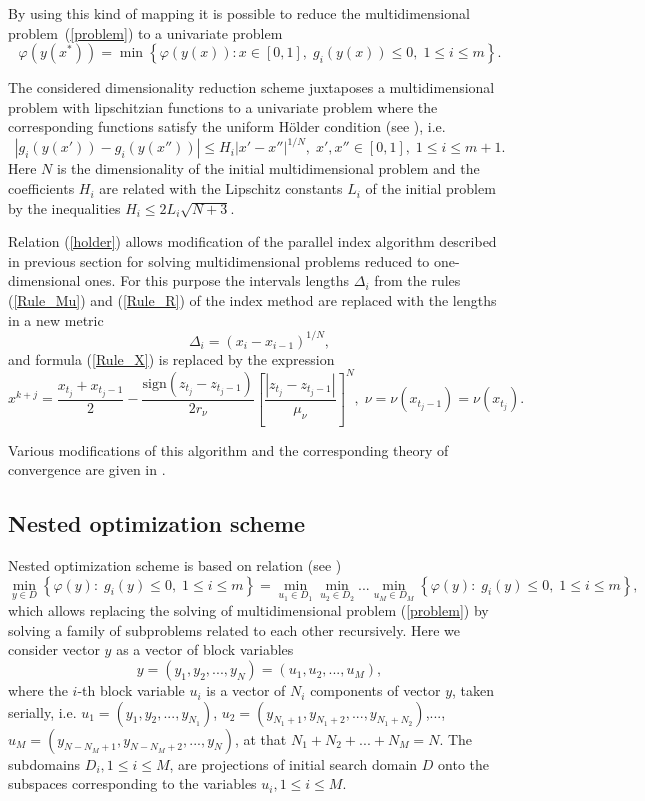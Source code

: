\documentclass[a4paper]{jpconf}
\begin{document}
By using this kind of mapping it is possible to reduce the multidimensional 
problem~(\ref{problem}) to a univariate problem
\[
\varphi(y(x^\ast))=\min \left\{\varphi(y(x)): x \in [0,1], \; g_i(y(x))\leq 
0, \; 1 \leq i \leq m\right\}.
\]

The considered dimensionality reduction scheme juxtaposes a
multidimensional problem with lipschitzian functions to a univariate
problem where the corresponding functions satisfy the uniform H{\"o}lder
condition (see \cite{Strongin2000}), i.e.
\begin{equation}\label{holder}
\left|g_i(y(x'))-g_i (y(x''))\right| \leq H_i \left|x'-x'' \right|^{1/N}, \; 
x',x''\in [0,1], \; 1\leq i \leq m+1.
\end{equation}
Here $N$ is the dimensionality of the initial multidimensional problem and
the coefficients $H_i$ are related with the Lipschitz constants $L_i$ of
the initial problem by the inequalities $H_i \leq 2L_i \sqrt{N+3}$.

Relation (\ref{holder}) allows modification of the parallel index algorithm described in previous section for solving multidimensional problems reduced to one-dimensional ones. For this purpose the intervals lengths $\Delta_i$ from the rules (\ref{Rule_Mu}) and (\ref{Rule_R}) of the index method are replaced with the lengths in a new metric
\[
\Delta_i = \left(x_i-x_{i-1}\right)^{1/N},
\]
and formula (\ref{Rule_X}) is replaced by the expression
\[
x^{k+j} = \frac{x_{t_j}+x_{t_j-1}}{2} - \frac{\mathrm{sign}(z_{t_j}-z_{t_j-1})}{2r_\nu}\left[\frac{\left|z_{t_j}-z_{t_j-1}\right|}{\mu_\nu}\right]^N, \; \nu=\nu(x_{t_j-1})=\nu(x_{t_j}).
\]

Various modifications of this algorithm and the corresponding theory of convergence are given in \cite{Strongin2000,Strongin2013,Gergel2005}.


\subsection{Nested optimization scheme}

Nested optimization scheme is based on relation (see \cite{Strongin2013})
\[
\min_{y \in D}{\left\{\varphi(y): \; g_i(y)\leq 0, \; 1 \leq i \leq 
m\right\}}= \min_{u_1\in D_1}\min_{u_2\in D_2}...\min_{u_M\in D_M 
}{\left\{\varphi(y): \; g_i(y)\leq 0, \; 1 \leq i \leq m\right\}},
\]
which allows replacing the solving of multidimensional problem 
(\ref{problem}) by solving a family of subproblems related to each other 
recursively.
Here we consider vector $y$ as a vector of block variables
\[
y=(y_1,y_2,...,y_N)=(u_1,u_2,...,u_M),
\]
where the $i$-th block variable $u_i$ is a vector of $N_i$ components of 
vector $y$, taken serially, i.e. $u_1=(y_1,y_2,...,y_{N_1})$, 
$u_2=(y_{N_1+1},y_{N_1+2},...,y_{N_1+N_2})$,..., $u_M=(y_{N-N_M+1},y_{N-
N_M+2},...,y_{N})$, at that $N_1+N_2+...+N_M=N$. 
The subdomains $D_i, 1 \leq i \leq M$, are projections of initial search 
domain $D$ onto the subspaces corresponding to the variables $u_i, 1 \leq i 
\leq M$.
\end{document}
